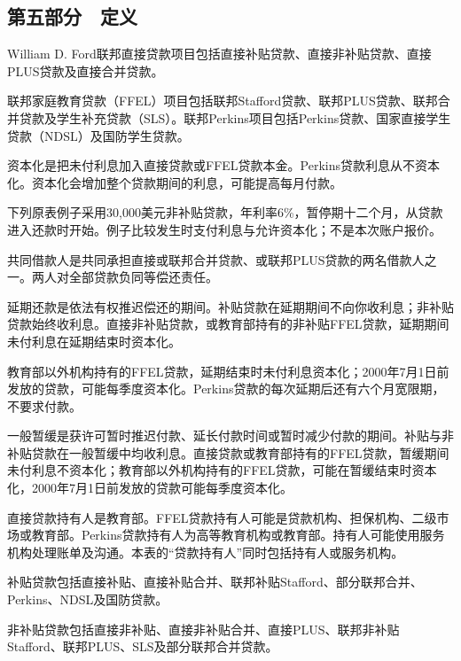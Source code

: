 \documentclass[UTF8,fontset=none,11pt,a4paper]{ctexart}
\begin{document}
\subsection*{第五部分　定义}
William D. Ford联邦直接贷款项目包括直接补贴贷款、直接非补贴贷款、直接PLUS贷款及直接合并贷款。


联邦家庭教育贷款（FFEL）项目包括联邦Stafford贷款、联邦PLUS贷款、联邦合并贷款及学生补充贷款（SLS）。联邦Perkins项目包括Perkins贷款、国家直接学生贷款（NDSL）及国防学生贷款。


资本化是把未付利息加入直接贷款或FFEL贷款本金。Perkins贷款利息从不资本化。资本化会增加整个贷款期间的利息，可能提高每月付款。


下列原表例子采用30,000美元非补贴贷款，年利率6\%，暂停期十二个月，从贷款进入还款时开始。例子比较发生时支付利息与允许资本化；不是本次账户报价。


共同借款人是共同承担直接或联邦合并贷款、或联邦PLUS贷款的两名借款人之一。两人对全部贷款负同等偿还责任。


延期还款是依法有权推迟偿还的期间。补贴贷款在延期期间不向你收利息；非补贴贷款始终收利息。直接非补贴贷款，或教育部持有的非补贴FFEL贷款，延期期间未付利息在延期结束时资本化。


教育部以外机构持有的FFEL贷款，延期结束时未付利息资本化；2000年7月1日前发放的贷款，可能每季度资本化。Perkins贷款的每次延期后还有六个月宽限期，不要求付款。


一般暂缓是获许可暂时推迟付款、延长付款时间或暂时减少付款的期间。补贴与非补贴贷款在一般暂缓中均收利息。直接贷款或教育部持有的FFEL贷款，暂缓期间未付利息不资本化；教育部以外机构持有的FFEL贷款，可能在暂缓结束时资本化，2000年7月1日前发放的贷款可能每季度资本化。


直接贷款持有人是教育部。FFEL贷款持有人可能是贷款机构、担保机构、二级市场或教育部。Perkins贷款持有人为高等教育机构或教育部。持有人可能使用服务机构处理账单及沟通。本表的“贷款持有人”同时包括持有人或服务机构。


补贴贷款包括直接补贴、直接补贴合并、联邦补贴Stafford、部分联邦合并、Perkins、NDSL及国防贷款。


非补贴贷款包括直接非补贴、直接非补贴合并、直接PLUS、联邦非补贴Stafford、联邦PLUS、SLS及部分联邦合并贷款。
\end{document}
